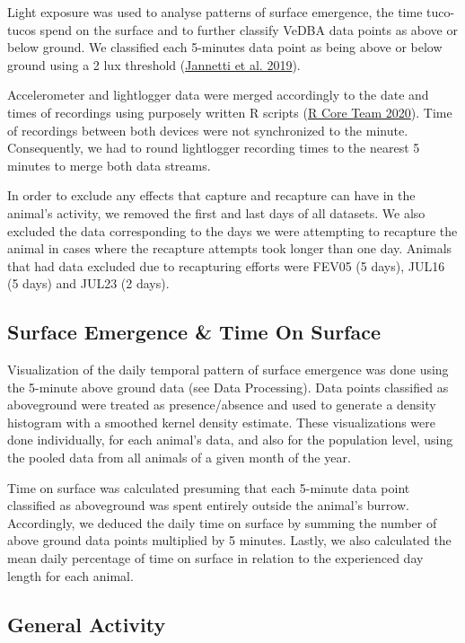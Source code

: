 \documentclass[msc,numbers,hidelinks]{coppe}
\begin{document}
  Light exposure was used to analyse patterns of surface emergence, the time tuco-tucos spend on the surface and to further classify VeDBA data points as above or below ground. We classified each 5-minutes data point as being above or below ground using a 2 lux threshold (\protect\hyperlink{ref-jannetti2019}{Jannetti et al. 2019}).

  Accelerometer and lightlogger data were merged accordingly to the date and times of recordings using purposely written R scripts (\protect\hyperlink{ref-rcoreteam2020}{R Core Team 2020}). Time of recordings between both devices were not synchronized to the minute. Consequently, we had to round lightlogger recording times to the nearest 5 minutes to merge both data streams.

  In order to exclude any effects that capture and recapture can have in the animal's activity, we removed the first and last days of all datasets. We also excluded the data corresponding to the days we were attempting to recapture the animal in cases where the recapture attempts took longer than one day. Animals that had data excluded due to recapturing efforts were FEV05 (5 days), JUL16 (5 days) and JUL23 (2 days).

  \hypertarget{surface-emergence-time-on-surface}{%
  \subsection{Surface Emergence \& Time On Surface}\label{surface-emergence-time-on-surface}}

  Visualization of the daily temporal pattern of surface emergence was done using the 5-minute above ground data (see Data Processing). Data points classified as aboveground were treated as presence/absence and used to generate a density histogram with a smoothed kernel density estimate. These visualizations were done individually, for each animal's data, and also for the population level, using the pooled data from all animals of a given month of the year.

  Time on surface was calculated presuming that each 5-minute data point classified as aboveground was spent entirely outside the animal's burrow. Accordingly, we deduced the daily time on surface by summing the number of above ground data points multiplied by 5 minutes. Lastly, we also calculated the mean daily percentage of time on surface in relation to the experienced day length for each animal.

  \hypertarget{general-activity}{%
  \subsection{General Activity}\label{general-activity}}
\end{document}
